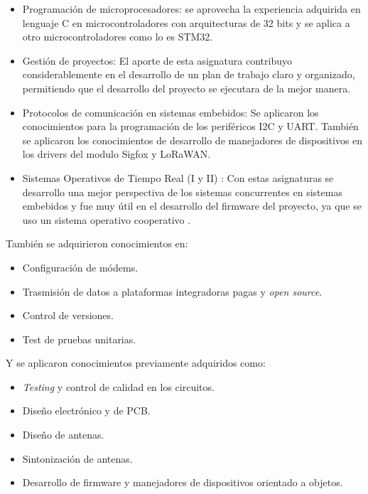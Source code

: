 \begin{itemize}
\item Programación de microprocesadores: se aprovecha la experiencia adquirida en lenguaje C en microcontroladores con arquitecturas de 32 bits y se aplica a otro microcontroladores como lo es STM32.
\item Gestión de proyectos: El aporte de esta asignatura contribuyo considerablemente en el desarrollo de un plan de trabajo claro y organizado, permitiendo que el desarrollo del proyecto se ejecutara de la mejor manera.
\item Protocolos de comunicación en sistemas embebidos: Se aplicaron los conocimientos para la programación de los periféricos I2C y UART. También se aplicaron los conocimientos de desarrollo de manejadores de dispositivos en los drivers del modulo Sigfox y LoRaWAN.
\item Sistemas Operativos de Tiempo Real (I y II) : Con estas asignaturas se desarrollo una mejor perspectiva de los sistemas concurrentes en sistemas embebidos y fue muy útil en el desarrollo del firmware del proyecto, ya que se uso un sistema operativo cooperativo .
\end{itemize}

También se adquirieron conocimientos en:
\begin{itemize}
    \item Configuración de módems.
    \item Trasmisión de datos a plataformas integradoras pagas y \textit{open source}.
    \item Control de versiones.
    \item Test de pruebas unitarias.
\end{itemize}

Y se aplicaron conocimientos previamente adquiridos como:
\begin{itemize}
    \item \textit{Testing} y control de calidad en los circuitos.
    \item Diseño electrónico y de PCB.
    \item Diseño de antenas.
    \item Sintonización de antenas.
    \item Desarrollo de firmware y manejadores de dispositivos orientado a objetos.
\end{itemize}


